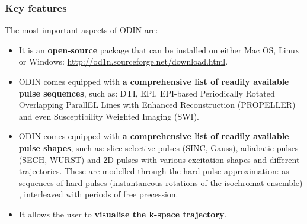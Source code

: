 \subsubsection{Key features}
The most important aspects of ODIN are:
\begin{itemize}

    \item It is an \textbf{open-source} package that can be installed on either Mac OS, Linux or Windows: \url{http://od1n.sourceforge.net/download.html}.
    
    \item ODIN comes equipped with \textbf{a comprehensive list of readily available pulse sequences}, such as: DTI, EPI, EPI-based Periodically Rotated Overlapping ParallEL Lines with Enhanced Reconstruction (PROPELLER) and even Susceptibility Weighted Imaging (SWI).
    
    \item ODIN comes equipped with \textbf{a comprehensive list of readily available pulse shapes}, such as: slice-selective pulses (SINC, Gauss), adiabatic pulses (SECH, WURST) and 2D pulses with various excitation shapes and different trajectories.
    These are modelled through the hard-pulse approximation: as sequences of hard pulses (instantaneous rotations of the isochromat ensemble) \cite{bernsteinhandbook}, interleaved with periods of free precession.
    
    \item It allows the user to \textbf{visualise the k-space trajectory}.
    
\end{itemize}

\hfill

